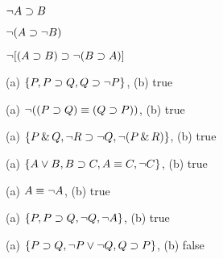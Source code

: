 \begin{earg}
\item %
$\neg A \supset B$
\item %
$\neg(A \supset \neg B)$
\item %
$\neg [(A\supset B) \supset \neg(B\supset A)]$
\end{earg}



\begin{earg}
\item (a) $\{P, P \supset Q, Q \supset \neg P\}$, (b) true
\item (a) $\neg((P \supset Q) \equiv (Q \supset P))$, (b) true
\item (a) $\{P \,\&\, Q, \neg R \supset \neg Q, \neg (P \,\&\, R)\}$, (b) true
\item (a) $\{A \vee B, B \supset C, A \equiv C, \neg C\}$, (b) true
\item (a) $A \equiv \neg A$, (b) true
\item (a) $\{P, P \supset Q, \neg Q, \neg A\}$, (b) true
\item (a) $\{P \supset Q, \neg P \vee \neg Q, Q \supset P\}$, (b) false
\end{earg}



